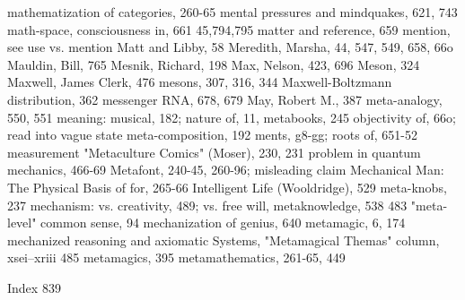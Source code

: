 mathematization of categories, 260-65            mental pressures and mindquakes, 621, 743
math-space, consciousness in, 661                 45,794,795
matter and reference, 659                        mention, see use vs. mention
Matt and Libby, 58                               Meredith, Marsha, 44, 547, 549, 658, 66o
Mauldin, Bill, 765                               Mesnik, Richard, 198
Max, Nelson, 423, 696                            Meson, 324
Maxwell, James Clerk, 476                        mesons, 307, 316, 344
Maxwell-Boltzmann distribution, 362              messenger RNA, 678, 679
May, Robert M., 387                              meta-analogy, 550, 551
meaning: musical, 182; nature of, 11,            metabooks, 245
objectivity of, 66o; read into vague state       meta-composition, 192
ments, g8-gg; roots of, 651-52 measurement       "Metaculture Comics" (Moser), 230, 231
 problem in quantum mechanics, 466-69            Metafont, 240-45, 260-96; misleading claim
Mechanical Man: The Physical Basis of             for, 265-66
 Intelligent Life (Wooldridge), 529              meta-knobs, 237
mechanism: vs. creativity, 489; vs. free will,   metaknowledge, 538
 483                                             "meta-level" common sense, 94
mechanization of genius, 640                     metamagic, 6, 174
mechanized reasoning and axiomatic Systems,      "Metamagical Themas" column, xsei--xriii
 485                                             metamagics, 395
                                                 metamathematics, 261-65, 449

 Index                                                                                       839


